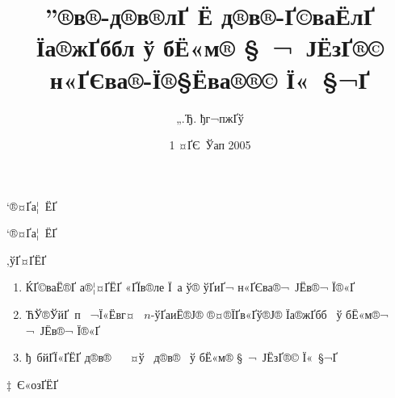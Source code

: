\documentclass[12pt,a4,portrait]{lucassem1}
\title{”®в®­-д®в®­­лҐ Ё д®в®­-­Ґ©ваЁ­­лҐ Їа®жҐббл 
ў бЁ«м­® § ¬ Ј­ЁзҐ­­®©  
н«ҐЄва®­-Ї®§Ёва®­­®© Ї« §¬Ґ 
}
\author{„.Ђ. ђг¬п­жҐў }
\date{1 ¤ҐЄ Ўап 2005}
\begin{document}
\newcommand{\heading}[1]{
  \begin{center}
    \blue
    \large\bf
    \shadowbox{#1}
  \end{center}
  \vspace{1ex minus 1ex}}

\begin{slide}

\slidemakewidetitle

\end{slide}

\begin{Slide}{‘®¤Ґа¦ ­ЁҐ} 

\vspace*{15mm}

\centerline{\blue\LARGE ‘®¤Ґа¦ ­ЁҐ}

\vspace*{15mm}

\begin{center}
\begin{minipage}{0.8\textwidth}
{\blue ‚ўҐ¤Ґ­ЁҐ}

\begin{enumerate}
\item {\blue ЌҐ©ваЁ­­®Ґ а®¦¤Ґ­ЁҐ «ҐЇв®­­ле Ї а 
                 ў® ў­Ґи­Ґ¬ н«ҐЄва®¬ Ј­Ёв­®¬ Ї®«Ґ}
\item {\blue ЋЎ®ЎйҐ­­ п  ¬Ї«Ёвг¤  $n$-ўҐаиЁ­­®Ј® ®¤­®ЇҐв«Ґў®Ј® 
           Їа®жҐбб   ў бЁ«м­®¬ ¬ Ј­Ёв­®¬ Ї®«Ґ}
\item {\blue ђ бйҐЇ«Ґ­ЁҐ д®в®­  ­  ¤ў  д®в®­  ў бЁ«м­® 
        § ¬ Ј­ЁзҐ­­®© Ї« §¬Ґ}
\end{enumerate}
{\blue ‡ Є«озҐ­ЁҐ}

\end{minipage} 
\end{center}

\end{Slide}

 

 


 

\end{document}
